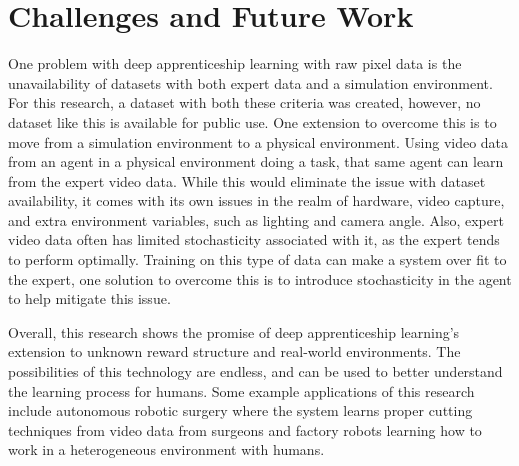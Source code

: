 \documentclass[12pt,american]{report}
\begin{document}
\section{Challenges and Future Work}
One problem with deep apprenticeship learning with raw pixel data is the unavailability of datasets with both expert data and a simulation environment.  For this research, a dataset with both these criteria was created, however, no dataset like this is available for public use.  One extension to overcome this is to move from a simulation environment to a physical environment.  Using video data from an agent in a physical environment doing a task, that same agent can learn from the expert video data.  While this would eliminate the issue with dataset availability, it comes with its own issues in the realm of hardware, video capture, and extra environment variables, such as lighting and camera angle.  Also, expert video data often has limited stochasticity associated with it, as the expert tends to perform optimally.  Training on this type of data can make a system over fit to the expert, one solution to overcome this is to introduce stochasticity in the agent to help mitigate this issue.

Overall, this research shows the promise of deep apprenticeship learning's extension to unknown reward structure and real-world environments. The possibilities of this technology are endless, and can be used to better understand the learning process for humans.  Some example applications of this research include autonomous robotic surgery where the system learns proper cutting techniques from video data from surgeons and factory robots learning how to work in a heterogeneous environment with humans. 

  \nocite{*}


\begin{singlespace}

\end{singlespace}

\appendix
\end{document}

